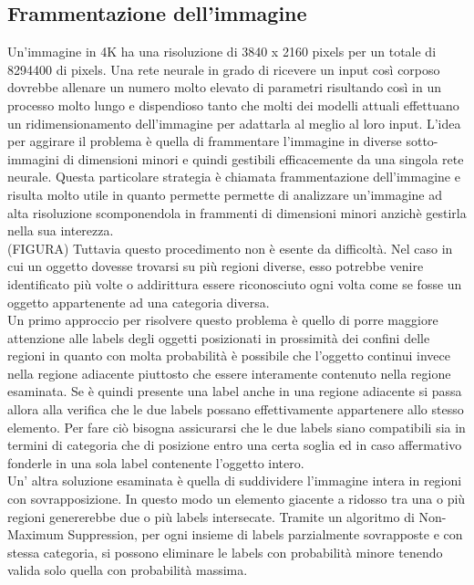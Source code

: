 \subsection{Frammentazione dell'immagine}
Un'immagine in 4K ha una risoluzione di 3840 x 2160 pixels per un totale di 8294400 di pixels. Una rete neurale in grado di ricevere un input così corposo dovrebbe allenare un numero molto elevato di parametri risultando così in un processo molto lungo e dispendioso tanto che molti dei modelli attuali effettuano un ridimensionamento dell'immagine per adattarla al meglio al loro input. L'idea per aggirare il problema è quella di frammentare l'immagine in diverse sotto-immagini di dimensioni minori e quindi gestibili efficacemente da una singola rete neurale. Questa particolare strategia è chiamata frammentazione dell'immagine e risulta molto utile in quanto permette permette di analizzare un'immagine ad alta risoluzione scomponendola in frammenti di dimensioni minori anzichè gestirla nella sua interezza.\\
(FIGURA)
Tuttavia questo procedimento non è esente da difficoltà.  Nel caso in cui un oggetto dovesse trovarsi su più regioni diverse, esso potrebbe venire identificato più volte o addirittura essere riconosciuto ogni volta come se fosse un oggetto appartenente ad una categoria diversa.\\
Un primo approccio per risolvere questo problema è quello di porre maggiore attenzione alle labels degli oggetti posizionati in prossimità dei confini delle regioni in quanto con molta probabilità è possibile che l'oggetto continui invece nella regione adiacente piuttosto che essere interamente contenuto nella regione esaminata. Se è quindi presente una label anche in una regione adiacente si passa allora alla verifica che le due labels possano effettivamente appartenere allo stesso elemento. Per fare ciò bisogna assicurarsi che le due labels siano compatibili sia in termini di categoria  che di posizione entro una certa soglia ed in caso affermativo fonderle in una sola label contenente l'oggetto intero.\\
Un' altra soluzione esaminata è quella di suddividere l'immagine intera in regioni con sovrapposizione. In questo modo un elemento giacente a ridosso tra una o più regioni genererebbe due o più labels intersecate. Tramite un algoritmo di Non-Maximum Suppression, per ogni insieme di labels parzialmente sovrapposte e con stessa categoria, si possono eliminare le labels con probabilità minore tenendo valida solo quella con probabilità massima.